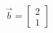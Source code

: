 \documentclass[preview]{standalone}
\begin{document}
\begin{align*}
\vec{b}=\begin{bmatrix}2\\1\end{bmatrix}
\end{align*}
\end{document}
